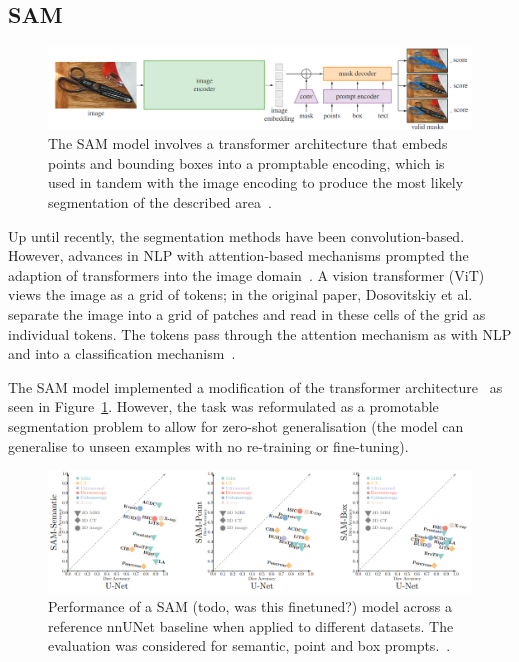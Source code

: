 \documentclass[12pt,twoside]{report}
\begin{document}

\subsection{SAM}

\begin{figure}[H]
  \centering
  \includegraphics[width=1\linewidth]{../figures/SAM.png}
  \caption{The SAM model involves a transformer architecture that embeds points and bounding boxes into a promptable encoding, which is used in tandem with the image encoding to produce the most likely segmentation of the described area~\cite{SAM}.}\label{fig:sam}
\end{figure}

Up until recently, the segmentation methods have been convolution-based. However, advances in NLP with attention-based mechanisms prompted the adaption of transformers into the image domain~\cite{attention, ViT}. A vision transformer (ViT) views the image as a grid of tokens; in the original paper, Dosovitskiy et al. separate the image into a grid of patches and read in these cells of the grid as individual tokens. The tokens pass through the attention mechanism as with NLP and into a classification mechanism~\cite{ViT}. 

The SAM model implemented a modification of the transformer architecture~\cite{SAM} as seen in Figure~\ref{fig:sam}. However, the task was reformulated as a promotable segmentation problem to allow for zero-shot generalisation (the model can generalise to unseen examples with no re-training or fine-tuning).

\begin{figure}[H]
  \centering
  \includegraphics[width=1\linewidth]{../figures/sam-performance.png}
  \caption{Performance of a SAM (todo, was this finetuned?) model across a reference nnUNet baseline when applied to different datasets. The evaluation was considered for semantic, point and box prompts.~\cite{he2023computervision}.}\label{fig:sam-performance}
\end{figure}
\end{document}
